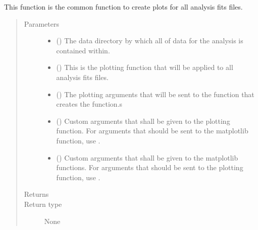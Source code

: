 \documentclass[letterpaper,10pt,english]{sphinxmanual}
\begin{document}
\begin{fulllineitems}
\label{\detokenize{docstrings/ifa_smeargle.plotting.base_functions:ifa_smeargle.plotting.base_functions.create_directory_plot_files}}
This function is the common function to create plots for
all analysis fits files.
\begin{quote}\begin{description}
\item[{Parameters}] \leavevmode\begin{itemize}
\item {} 
 () \textendash{} The data directory by which all of data for the analysis
is contained within.

\item {} 
 () \textendash{} This is the plotting function that will be applied to all
analysis fits files.

\item {} 
 () \textendash{} The plotting arguments that will be sent to the function
that creates the function.s

\item {} 
 () \textendash{} Custom arguments that shall be given to the plotting
function. For arguments that should be sent to the
matplotlib function, use .

\item {} 
 () \textendash{} Custom arguments that shall be given to the matplotlib
functions. For arguments that should be sent to the
plotting function, use .

\end{itemize}

\item[{Returns}] \leavevmode


\item[{Return type}] \leavevmode
None

\end{description}\end{quote}

\end{fulllineitems}
\end{document}
